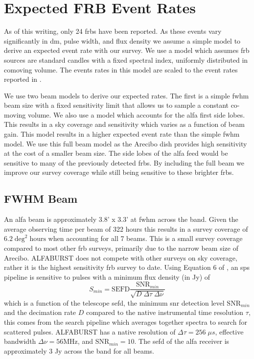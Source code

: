 \documentclass[a4paper,fleqn,usenatbib]{mnras}
\begin{document}

\section{Expected FRB Event Rates}
\label{sec:event_rates}

As of this writing, only 24 \glspl{frb} have been reported. As these events vary
significantly in \gls{dm}, pulse width, and flux density we assume a simple
model to derive an expected event rate with our survey.  We use a model
\citep{2013MNRAS.436L...5L} which assumes \gls{frb} sources are standard candles
with a fixed spectral index, uniformly distributed in comoving volume. The
events rates in this model are scaled to the event rates reported in
\cite{2013Sci...341...53T}.

We use two beam models to derive our expected rates. The first is a simple
\gls{fwhm} beam size with a fixed sensitivity limit that allows us to sample a
constant co-moving volume. We also use a model which accounts for the \gls{alfa}
first side lobes. This results in a sky coverage and sensitivity which varies as
a function of beam gain. This model results in a higher expected event rate than
the simple \gls{fwhm} model. We use this full beam model as the Arecibo dish
provides high sensitivity at the cost of a smaller beam size. The side lobes of
the \gls{alfa} feed would be sensitive to many of the previously detected
\glspl{frb}. By including the full beam we improve our survey coverage while
still being sensitive to these brighter \glspl{frb}.

\subsection{FWHM Beam}
\label{sec:fwhm_beam_rates}

An \gls*{alfa} beam is approximately 3.8' x 3.3' at \gls*{fwhm} across the band.
Given the average observing time per beam of 322 hours this results in a survey
coverage of $6.2 \; \textrm{deg}^2 \; \textrm{hours}$ when accounting for all 7
beams. This is a small survey coverage compared to most other \gls{frb} surveys,
primarily due to the narrow beam size of Arecibo. ALFABURST does not compete
with other surveys on sky coverage, rather it is the highest sensitivity
\gls{frb} survey to date.  Using Equation 6 of \cite{2015MNRAS.452.1254K}, an
\gls*{sps} pipeline is sensitive to pulses with a minimum flux density (in Jy)
of
%
\begin{equation}
S_{min} = \textrm{SEFD} \frac{\textrm{SNR}_{min}}{\sqrt{D \; \Delta \tau \;
\Delta \nu}}
\end{equation}
%
which is a function of the telescope \gls*{sefd}, the minimum \gls*{snr}
detection level $\textrm{SNR}_{min}$ and the decimation rate $D$ compared to the
native instrumental time resolution $\tau$, this comes from the search pipeline
which averages together spectra to search for scattered pulses. ALFABURST has a
native resolution of $\Delta \tau = 256 \; \mu s$, effective bandwidth $\Delta
\nu = 56 \textrm{MHz}$, and $\textrm{SNR}_{min} = 10$. The \gls*{sefd} of the
\gls*{alfa} receiver is approximately 3 Jy across the band for all beams.
\end{document}
